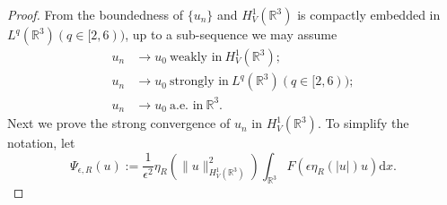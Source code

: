 \documentclass[10pt,a4paper]{amsart}
\begin{document}
\begin{proof}
From the boundedness of $\{u_n\}$ and $H^{1}_{V}(\mathbb{R}^{3})$ is compactly embedded in $L^q(\mathbb{R}^3)(q\in[2,6))$, up to a sub-sequence we may assume
\begin{equation*}
		\begin{split}
	u_n&\to u_0~\text{weakly in}~H^{1}_{V}(\mathbb{R}^3);\\
	u_n&\to u_0~\text{strongly in}~L^{q}(\mathbb{R}^3)(q\in[2,6));\\
	u_n&\to u_0~\text{a.e. in}~ \mathbb{R}^3.
	\end{split}\end{equation*}
Next we prove the strong convergence of $u_{n}$ in $H_{V}^{1}\left ( \mathbb{R}^{3} \right ) $. To simplify the notation, let $$ \Psi_{\epsilon,R}\left ( u \right ):=\frac{1}{\epsilon ^{2}}\eta _{R}\left (\|u\|_{H^1_V(\mathbb{R}^3)}^{2}\right )\int_{\mathbb{R}^{3}}F\left (\epsilon \eta _{R} \left ( \left | u\right |\right )u\right )\text{d}x.$$


\end{proof}
\end{document}

